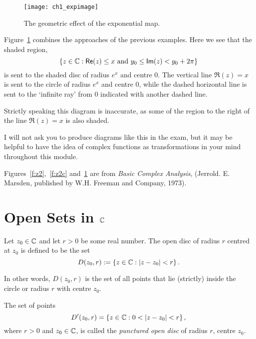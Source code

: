 \begin{full}
\begin{remark}

\begin{figure}[H]
\centering
\texttt{[image: ch1\_expimage]}
\caption{The geometric effect of the exponential map.}
\label{f:exp}
\end{figure}

Figure~\ref{f:exp} combines the approaches of the previous examples.  Here we see that the shaded region,
\[
\left\{z \in \mathbb{C}: \textsf{Re} (z) \leq x \text{ and } y_0 \leq \textsf{Im} (z) < y_0+2\pi\right\}
\]
is sent to the shaded disc of radius $e^x$ and centre $0$.  The vertical line $\Re(z)=x$ is sent to the circle of radius $e^x$ and centre $0$, while the dashed horizontal line is sent to the `infinite ray' from $0$ indicated with another dashed line.

Strictly speaking this diagram is inaccurate, as some of the region to the right of the line $\Re(z)=x$ is also shaded.

I will not ask you to produce diagrams like this in the exam, but it may be helpful to have the idea of complex functions as transformations in your mind throughout this module.

Figures~\ref{f:z2},~\ref{f:z2c} and~\ref{f:exp} are from \emph{Basic Complex Analysis}, (Jerrold. E. Marsden, published by W.H. Freeman and Company, 1973).  

\end{remark}
\end{full}


\section{Open Sets in $\mathbb{C}$}




\begin{definition}
Let $z_0 \in \mathbb{C}$ and let $r>0$ be some real number.  The open disc of radius $r$ centred at $z_0$ is defined to be the set 
\[
D(z_0,r):= \left\{ z \in \mathbb{C}: \left| z-z_0 \right| <r\right\}.
\]
\end{definition}
In other words, $D(z_0,r)$ is the set of all points that lie (strictly) inside the circle or radius $r$ with centre $z_0$.
\begin{definition}
The set of points
\[
D'(z_0,r) = \left\{ z \in \mathbb{C}: 0 < \left| z-z_0 \right| < r\right\},
\]
where $r>0$ and $z_0 \in \mathbb{C}$, is called the \emph{punctured open disc} of radius $r$, centre $z_0$.
\end{definition}




